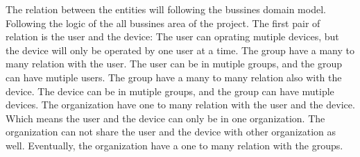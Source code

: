 The relation between the entities will following the bussines domain model. 
Following the logic of the all bussines area of the project. 
The first pair of relation is the user and the device: 
The user can oprating mutiple devices, but the device will only be operated 
by one user at a time. The group have a many to many relation with the user.
The user can be in mutiple groups, and the group can have mutiple users.
The group have a many to many relation also with the device.
The device can be in mutiple groups, and the group can have mutiple devices.
The organization have one to many relation with the user and the device.
Which means the user and the device can only be in one organization.
The organization can not share the user and the device with other organization as well.
Eventually, the organization have a one to many relation with the groups. 